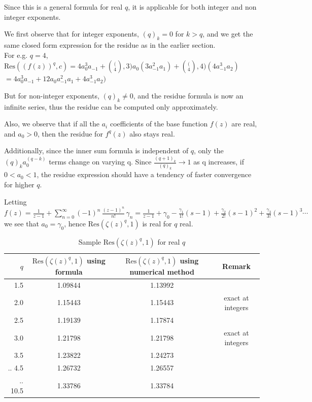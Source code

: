 \documentclass[a4paper,11pt,twoside]{amsart}
\newcommand\Res{\mathrm{Res}}
\begin{document}
Since this is a general formula for real $q$, it is applicable for both integer and non integer exponents.

We first observe that for integer exponents, $(q)_k = 0$ for $k>q$, and we get the same closed form expression for the residue as in the earlier section.\\
For e.g. $q=4$, $\Res((f(z))^q,c) = 4 a_{0}^3 a_{-1} + \binom(4,3) a_0 (3 a_{-1}^2 a_1) + \binom(4,4) (4 a_{-1}^3 a_2)$
$=4 a_{0}^3 a_{-1} + 12 a_0 a_{-1}^2 a_1 + 4 a_{-1}^3 a_2)$

But for non-integer exponents, $(q)_k \ne 0$, and the residue formula is now an infinite series, thus the residue can be computed only approximately.

Also, we observe that if all the $a_i$ coefficients of the base function $f(z)$ are real, and $a_0 > 0$, then the residue for $f^{q}(z)$ also stays real. 

Additionally, since the inner sum formula is independent of $q$, only the $(q)_k a_{0}^{(q-k)}$ terms change on varying q. Since $\frac{(q+1)_k}{(q)_k} \to 1$ as q increases, if $0 < a_0 < 1$, the residue expression should have a tendency of faster convergence for higher $q$. 

Letting $f(z) = \frac{1}{z-1} + \sum\limits_{n=0}^{\infty} (-1)^n\,\frac{(z-1)^n}{n!}\, \gamma_n = \frac{1}{z-1} + \gamma_0 - \frac{\gamma_1}{1!}(s-1) + \frac{\gamma_2}{2!}(s-1)^2 + \frac{\gamma_3}{3!}(s-1)^3 \cdots$ we see that $a_0 = \gamma_0$, hence $\Res(\zeta(z)^{q},1)$ is real for $q$ real.

\begin{table}[H]
  \begin{center}
    \caption{Sample $\Res(\zeta(z)^{q},1)$ for real $q$}
    \label{tab:table3}
    \begin{tabular}{r|c|c|c} 
      $q$ & $\Res(\zeta(z)^{q},1)$ using formula & $\Res(\zeta(z)^{q},1)$ using numerical method & Remark\\
      \hline
      1.5 & 1.09844 & 1.13992\\
      2.0 & 1.15443 & 1.15443 & exact at integers\\
      2.5 & 1.19139 & 1.17874\\
      3.0 & 1.21798 & 1.21798 & exact at integers\\
      3.5 & 1.23822 & 1.24273\\
      ..
      4.5 & 1.26732 & 1.26557 \\
      ..
      10.5 & 1.33786 & 1.33784 \\ 
    \end{tabular}
  \end{center}
\end{table}
\end{document}
